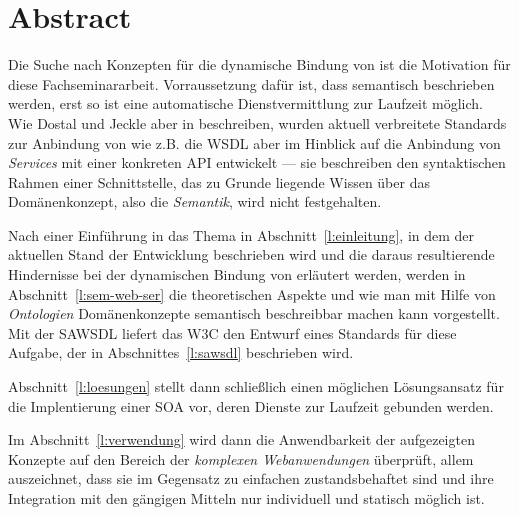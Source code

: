 \section*{Abstract}

Die Suche nach Konzepten für die dynamische Bindung von \ws ist die Motivation für diese Fachseminararbeit. Vorraussetzung dafür ist, dass \ws semantisch beschrieben werden, erst so ist eine automatische Dienstvermittlung zur Laufzeit möglich. Wie Dostal und Jeckle aber in \cite[S.55]{xmlspek1} beschreiben, wurden aktuell verbreitete Standards zur Anbindung von \ws wie z.B. die \acs{WSDL} aber im Hinblick auf die Anbindung von \emph{Services} mit einer konkreten \acs{API} entwickelt --- sie beschreiben den syntaktischen Rahmen einer Schnittstelle, das zu Grunde liegende Wissen über das Domänenkonzept, also die \emph{Semantik}, wird nicht festgehalten. 

Nach einer Einführung in das Thema in Abschnitt~\ref{l:einleitung}, in dem der aktuellen Stand der Entwicklung beschrieben wird und die daraus resultierende Hindernisse bei der dynamischen Bindung von \ws erläutert werden, werden in Abschnitt~\ref{l:sem-web-ser} die theoretischen Aspekte und wie man mit Hilfe von \emph{Ontologien} Domänenkonzepte semantisch beschreibbar machen kann vorgestellt. Mit der \acs{SAWSDL} liefert das \acs{W3C} den Entwurf eines Standards für diese Aufgabe, der in Abschnittes~\ref{l:sawsdl} beschrieben wird.

Abschnitt~\ref{l:loesungen} stellt dann schließlich einen möglichen Lösungsansatz für die Implentierung einer \acs{SOA} vor, deren Dienste zur Laufzeit gebunden werden.

Im Abschnitt~\ref{l:verwendung} wird dann die Anwendbarkeit der aufgezeigten Konzepte auf den Bereich der \emph{komplexen Webanwendungen} überprüft, allem auszeichnet, dass sie im Gegensatz zu einfachen \ws zustandsbehaftet sind und ihre Integration mit den gängigen Mitteln nur individuell und statisch möglich ist.